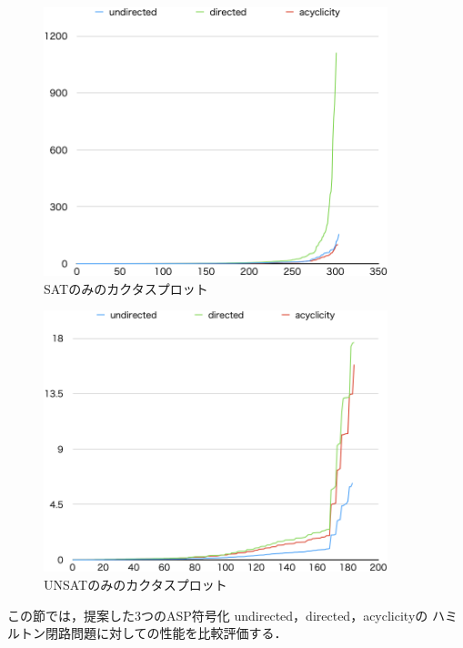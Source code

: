 \begin{figure}[tb]
\begin{center}
  \includegraphics[width=10cm]{fig/cactussat.png}
\caption{SATのみのカクタスプロット}
\label{cactussat}
\end{center}
\end{figure}

\begin{figure}[tb]
\begin{center}
  \includegraphics[width=10cm]{fig/cactusunsat.png}
\caption{UNSATのみのカクタスプロット}
\label{cactusunsat}
\end{center}
\end{figure}

この節では，提案した3つのASP符号化
\textsf{undirected}，\textsf{directed}，\textsf{acyclicity}の
ハミルトン閉路問題に対しての性能を比較評価する．

